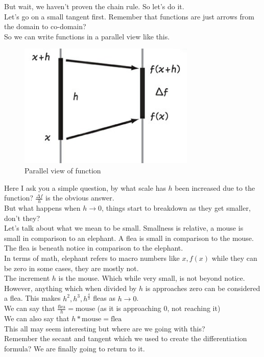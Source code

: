 But wait, we haven't proven the chain rule. So let's do it.\\
Let's go on a small tangent first. Remember that functions are just arrows from the domain to co-domain?\\
So we can write functions in a parallel view like this.
\begin{figure} [h]
    \centering
    \includegraphics[width=0.5\linewidth]{Photos/Parallel view of function_ Chain rule.png}
    \caption{Parallel view of function}
    
\end{figure}
Here I ask you a simple question, by what scale has $h$ been increased due to the function? $\frac{\Delta f}{h}$ is the obvious answer.\\
But what happens when $h \rightarrow 0$, things start to breakdown as they get smaller, don't they?\\
Let's talk about what we mean to be small. Smallness is relative, a mouse is small in comparison to an elephant. A flea is small in comparison to the mouse. The flea is beneath notice in comparison to the elephant.\\
In terms of math, elephant refers to macro numbers like $x, f(x)$ while they can be zero in some cases, they are mostly not.\\
The increment $h$ is the mouse. Which while very small, is not beyond notice. However, anything which when divided by $h$ is approaches zero can be considered a flea. This makes $h^2, h^3, h^{\frac{4}{3}}$ fleas as $h \rightarrow 0$.\\
We can say that $\frac{\text{flea}}{h}=\text{mouse}$ (as it is approaching 0, not reaching it)\\
We can also say that $h*\text{mouse}=\text{flea}$\\
This all may seem interesting but where are we going with this?\\
Remember the secant and tangent which we used to create the differentiation formula? We are finally going to return to it.\\
